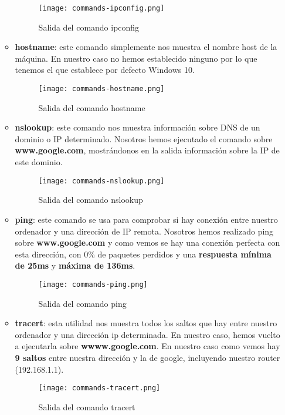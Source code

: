 \begin{enumerate}
\begin{itemize}
        \begin{figure}[H]
            \centering
            \texttt{[image: commands-ipconfig.png]}
            \caption{Salida del comando ipconfig}
        \end{figure}

        \item \textbf{hostname}: este comando simplemente nos muestra el nombre host de la máquina. En nuestro caso no hemos establecido ninguno por lo que tenemos el que establece por defecto Windows 10.

        \begin{figure}[H]
            \centering
            \texttt{[image: commands-hostname.png]}
            \caption{Salida del comando hostname}
        \end{figure}

        \item \textbf{nslookup}: este comando nos muestra información sobre DNS de un dominio o IP determinado. Nosotros hemos ejecutado el comando sobre \textbf{www.google.com}, mostrándonos en la salida información sobre la IP de este dominio.

        \begin{figure}[H]
            \centering
            \texttt{[image: commands-nslookup.png]}
            \caption{Salida del comando nslookup}
        \end{figure}

        \item \textbf{ping}: este comando se usa para comprobar si hay conexión entre nuestro ordenador y una dirección de IP remota. Nosotros hemos realizado ping sobre \textbf{www.google.com} y como vemos se hay una conexión perfecta con esta dirección, con 0\% de paquetes perdidos y una \textbf{respuesta mínima de 25ms} y \textbf{máxima de 136ms}.

            \begin{figure}[H]
            \centering
            \texttt{[image: commands-ping.png]}
            \caption{Salida del comando ping}
        \end{figure}

        \item \textbf{tracert}: esta utilidad nos muestra todos los saltos que hay entre nuestro ordenador y una dirección ip determinada. En nuestro caso, hemos vuelto a ejecutarla sobre \textbf{wwww.google.com}. En nuestro caso como vemos hay \textbf{9 saltos} entre nuestra dirección y la de google, incluyendo nuestro router (192.168.1.1).

        \begin{figure}[H]
            \centering
            \texttt{[image: commands-tracert.png]}
            \caption{Salida del comando tracert}
        \end{figure}
    \end{itemize}
\end{enumerate}


